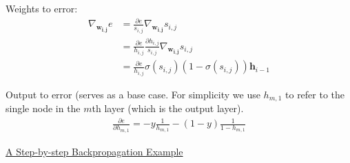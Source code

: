 \documentclass[assignment06_Solutions]{subfiles}
\begin{document}
Weights to error:
\begin{align}
\nabla_{\mathbf{w_{i,j}}} e &= \frac{\partial e} {s_{i,j}} \nabla_{\mathbf{w_{i,j}}} s_{i,j} \\
&= \frac{\partial e}{h_{i,j}}  \frac{\partial h_{i,j}}{s_{i,j}} \nabla_{\mathbf{w_{i,j}}} s_{i,j} \\
&= \frac{\partial e}{h_{i,j}}  \sigma(s_{i,j})(1-\sigma (s_{i,j})) \mathbf{h}_{i-1} 
\end{align}

Output to error (serves as a base case.  For simplicity we use $h_{m,1}$ to refer to the single node in the $m$th layer (which is the output layer).
\begin{align}
\frac{\partial{e}}{\partial h_{m,1}} = - y \frac{1}{h_{m,1}} - (1-y) \frac{1}{1-h_{m,1}}
\end{align}


\begin{externalresources}
\bi
\item \href{https://mattmazur.com/2015/03/17/a-step-by-step-backpropagation-example/}{A Step-by-step Backpropagation Example}
\ei
\end{externalresources}
\end{document}
